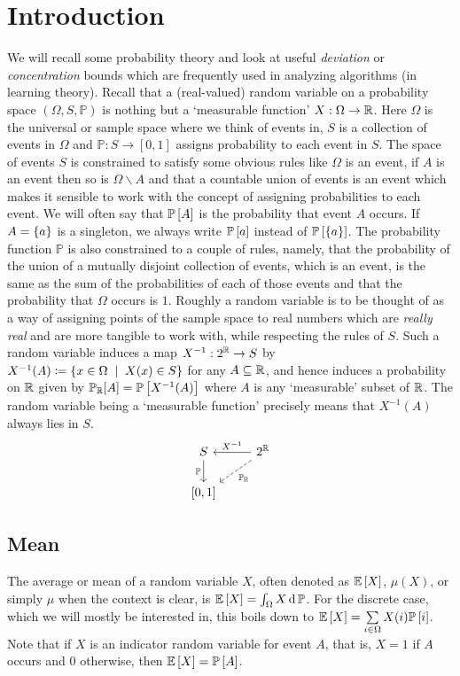 \section{Introduction}
We will recall some probability theory and look at useful \textit{deviation} or \textit{concentration} bounds which are frequently used in analyzing algorithms (in learning theory). Recall that a (real-valued) random variable on a probability space $(\Omega,S,\mathbb P)$ is nothing but a `measurable function' $X:\Omega\to \R$. Here $\Omega$ is the universal or sample space where we think of events in, $S$ is a collection of events in $\Omega$ and $\mathbb P:S\to[0,1]$ assigns probability to each event in $S$. The space of events $S$ is constrained to satisfy some obvious rules like $\Omega$ is an event, if $A$ is an event then so is $\Omega\smallsetminus A$ and that a countable union of events is an event which makes it sensible to work with the concept of assigning probabilities to each event. We will often say that $\P{A}$ is the probability that event $A$ occurs. If $A=\set{a}$ is a singleton, we always write $\P{a}$ instead of $\P{\set{a}}$. The probability function $\mathbb P$ is also constrained to a couple of rules, namely, that the probability of the union of a mutually disjoint collection of events, which is an event, is the same as the sum of the probabilities of each of those events and that the probability that $\Omega$ occurs is $1$. Roughly a random variable is to be thought of as a way of assigning points of the sample space to real numbers which are \textit{really real} and are more tangible to work with, while respecting the rules of $S$. Such a random variable induces a map $X^{-1}:2^{\R}\to S$ by $X^{-1}(A) \sett \set{x\in \Omega\st X(x) \in S}$ for any $A\subseteq \R$, and hence induces a probability on $\R$ given by $\mathbb P_{\R}[A] = \P{X^{-1}(A)}$ where $A$ is any `measurable' subset of $\R$. The random variable being a `measurable function' precisely means that $X^{-1}(A)$ always lies in $S$.
\[\begin{tikzcd}
	S & {2^\R} \\
	{[0,1]}
	\arrow["{\mathbb P}"', from=1-1, to=2-1]
	\arrow["{X^{-1}}"', from=1-2, to=1-1]
	\arrow["{\mathbb P_\R}", dashed, from=1-2, to=2-1]
\end{tikzcd}\]

\subsection{Mean}
The average or mean of a random variable $X$, often denoted as $\E X$, $\mu(X)$, or simply $\mu$ when the context is clear,  is $\E X = \int_{\Omega}  X \d\mathbb P $. For the discrete case, which we will mostly be interested in, this boils down to $\E X = \sum\limits_{i\in \Omega}X(i)\P{i}$. Note that if $X$ is an indicator random variable for event $A$, that is, $X=1$ if $A$ occurs and $0$ otherwise, then $\E X = \P A$.

